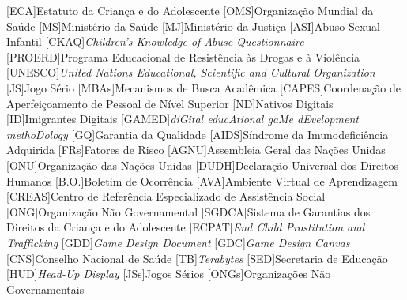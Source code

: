 
\listoffigures*
\cleardoublepage



\listoftables*
\cleardoublepage

\begin{siglas}
	\begin{acronym}[labelsep=1.5cm]
		\setlength{\itemindent}{1em}
		[ECA]{{Estatuto da Criança e do Adolescente}}
		[OMS]{{Organização Mundial da Saúde}} 
		[MS]{{Ministério da Saúde}} 
		[MJ]{{Ministério da Justiça}}
		[ASI]{{Abuso Sexual Infantil}} 
		{\textit{Children’s Knowledge of Abuse Questionnaire}}
		[PROERD]{{Programa Educacional de Resistência às Drogas e à Violência}}
		[UNESCO]{\textit{United Nations Educational, Scientific and Cultural Organization}}
		[JS]{{Jogo Sério}}
		{{Mecanismos de Busca Acadêmica}}
		[CAPES]{{Coordenação de Aperfeiçoamento de Pessoal de Nível Superior}}
		[ND]{{Nativos Digitais}}
		[ID]{{Imigrantes Digitais}}
		[GAMED]{\textit{diGital educAtional gaMe dEvelopment methoDology}}
		[GQ]{{Garantia da Qualidade}}
		{{Síndrome da Imunodeficiência Adquirida}}
		[FRs]{{Fatores de Risco}}
		{{Assembleia Geral das Nações Unidas}}
		[ONU]{{Organização das Nações Unidas}}
		{{Declaração Universal dos Direitos Humanos}}
		{{Boletim de Ocorrência}}
		[AVA]{{Ambiente Virtual de Aprendizagem}}
		[CREAS]{{Centro de Referência Especializado de Assistência Social}}
		[ONG]{{Organização Não Governamental}}
		[SGDCA]{{Sistema de Garantias dos Direitos da Criança e do Adolescente}}
		[ECPAT]{\textit{End Child Prostitution and Trafficking}}
		[GDD]{\textit{Game Design Document}}
		[GDC]{\textit{Game Design Canvas}}
		[CNS]{{Conselho Nacional de Saúde}}
		[TB]{\textit{Terabytes}}
		[SED]{{Secretaria de Educação}}
		[HUD]{\textit{Head-Up Display}}
		[JSs]{Jogos Sérios}
		{Organizações Não Governamentais}

	\end{acronym}
\end{siglas}
